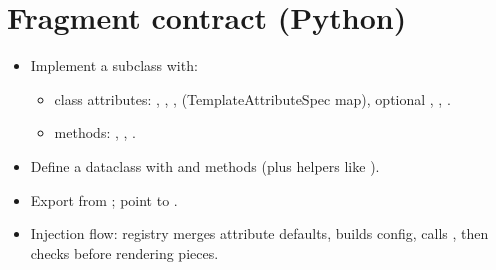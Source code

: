 \documentclass[a4paper,twoside]{article}
\begin{document}
\section{Fragment contract (Python)}
\begin{itemize}
\item Implement a  subclass with:
\begin{itemize}
\item class attributes: , , ,  (TemplateAttributeSpec map), optional , , .
\item methods: , , .
\end{itemize}
\item Define a  dataclass with  and  methods (plus helpers like ).
\item Export  from ; point   to .
\item Injection flow: registry merges attribute defaults, builds config, calls , then checks  before rendering pieces.
\end{itemize}
\end{document}
